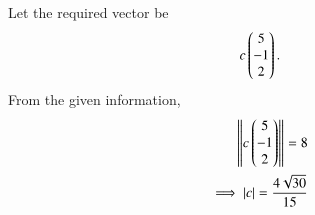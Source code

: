 Let the required vector be 
    \begin{align}
c\begin{pmatrix}5\\-1\\2\end{pmatrix}.
    \end{align}
    From the given information, 
    \begin{align}
        \left\lVert c\begin{pmatrix}5\\-1\\2\\\end{pmatrix}\right\rVert =  8 \\
	    \implies \left\vert c\right\vert = \frac{4\sqrt{30}}{15}
        \label{eq:12/10/2/10const}
    \end{align}

